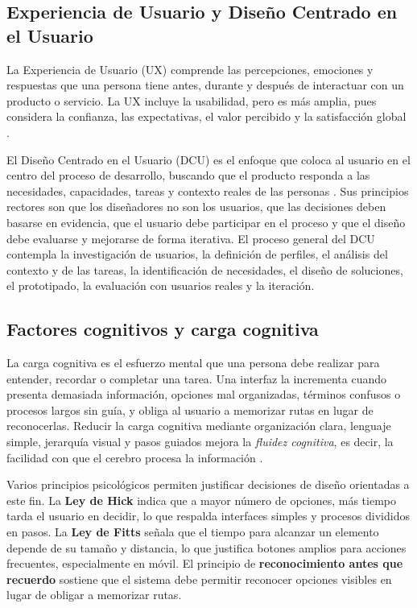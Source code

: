 \subsection{Experiencia de Usuario y Diseño Centrado en el Usuario}

La Experiencia de Usuario (UX) comprende las percepciones, emociones y respuestas que una persona tiene antes, durante y después de interactuar con un producto o servicio. La UX incluye la usabilidad, pero es más amplia, pues considera la confianza, las expectativas, el valor percibido y la satisfacción global \autocite{garrett2011}.

El Diseño Centrado en el Usuario (DCU) es el enfoque que coloca al usuario en el centro del proceso de desarrollo, buscando que el producto responda a las necesidades, capacidades, tareas y contexto reales de las personas \autocite{iso9241}. Sus principios rectores son que los diseñadores no son los usuarios, que las decisiones deben basarse en evidencia, que el usuario debe participar en el proceso y que el diseño debe evaluarse y mejorarse de forma iterativa. El proceso general del DCU contempla la investigación de usuarios, la definición de perfiles, el análisis del contexto y de las tareas, la identificación de necesidades, el diseño de soluciones, el prototipado, la evaluación con usuarios reales y la iteración.

\subsection{Factores cognitivos y carga cognitiva}

La carga cognitiva es el esfuerzo mental que una persona debe realizar para entender, recordar o completar una tarea. Una interfaz la incrementa cuando presenta demasiada información, opciones mal organizadas, términos confusos o procesos largos sin guía, y obliga al usuario a memorizar rutas en lugar de reconocerlas. Reducir la carga cognitiva mediante organización clara, lenguaje simple, jerarquía visual y pasos guiados mejora la \textit{fluidez cognitiva}, es decir, la facilidad con que el cerebro procesa la información \autocite{norman2002}.

Varios principios psicológicos permiten justificar decisiones de diseño orientadas a este fin. La \textbf{Ley de Hick} indica que a mayor número de opciones, más tiempo tarda el usuario en decidir, lo que respalda interfaces simples y procesos divididos en pasos. La \textbf{Ley de Fitts} señala que el tiempo para alcanzar un elemento depende de su tamaño y distancia, lo que justifica botones amplios para acciones frecuentes, especialmente en móvil. El principio de \textbf{reconocimiento antes que recuerdo} sostiene que el sistema debe permitir reconocer opciones visibles en lugar de obligar a memorizar rutas.

